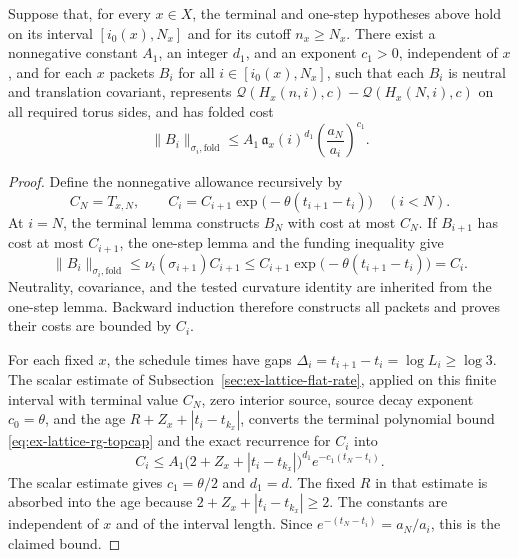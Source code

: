 \begin{theorem}
\label{thm:ex-lattice-rg-construction}
Suppose that, for every $x\in X$, the terminal and one-step hypotheses
above hold on its interval $[i_0(x),N_x]$ and for its cutoff $n_x\geq N_x$.
There exist a nonnegative constant $A_1$, an integer $d_1$, and an exponent
$c_1>0$, independent of $x$, and for each $x$ packets $B_i$ for all
$i\in[i_0(x),N_x]$, such that each $B_i$ is neutral and translation covariant, represents
$\mathscr Q(H_x(n,i),c)-\mathscr Q(H_x(N,i),c)$ on all required torus sides, and has folded
cost
\[
 \|B_i\|_{\sigma_i,\mathrm{fold}}
 \leq A_1\,\mathfrak a_x(i)^{d_1}
       \left(\frac{a_N}{a_i}\right)^{c_1}.
 \]
\end{theorem}

\begin{proof}
Define the nonnegative allowance recursively by
\[
 C_N=T_{x,N},\qquad
 C_i=C_{i+1}\exp\bigl(-\theta(t_{i+1}-t_i)\bigr)
 \quad(i<N).
\]
At $i=N$, the terminal lemma constructs $B_N$ with cost at most $C_N$.
If $B_{i+1}$ has cost at most $C_{i+1}$, the one-step lemma and the
funding inequality give
\[
 \|B_i\|_{\sigma_i,\mathrm{fold}}
 \leq\nu_i(\sigma_{i+1})C_{i+1}
 \leq C_{i+1}\exp\bigl(-\theta(t_{i+1}-t_i)\bigr)=C_i.
\]
Neutrality, covariance, and the tested curvature identity are inherited
from the one-step lemma. Backward induction therefore constructs all
packets and proves their costs are bounded by $C_i$.

For each fixed $x$, the schedule times have gaps
$\Delta_i=t_{i+1}-t_i=\log L_i\geq\log3$. The scalar estimate of
Subsection~\ref{sec:ex-lattice-flat-rate}, applied on this finite interval
with terminal value $C_N$, zero interior source, source decay exponent
$c_0=\theta$, and the age
$R+Z_x+|t_i-t_{k_x}|$, converts the terminal polynomial bound
\eqref{eq:ex-lattice-rg-topcap} and the exact recurrence for $C_i$ into
\[
 C_i\leq A_1\bigl(2+Z_x+|t_i-t_{k_x}|\bigr)^{d_1}
       e^{-c_1(t_N-t_i)}.
\]
The scalar estimate gives $c_1=\theta/2$ and $d_1=d$. The fixed $R$ in
that estimate is absorbed into the age because
$2+Z_x+|t_i-t_{k_x}|\geq2$. The constants are independent of $x$ and
of the interval length. Since $e^{-(t_N-t_i)}=a_N/a_i$, this is the
claimed bound.
\end{proof}

